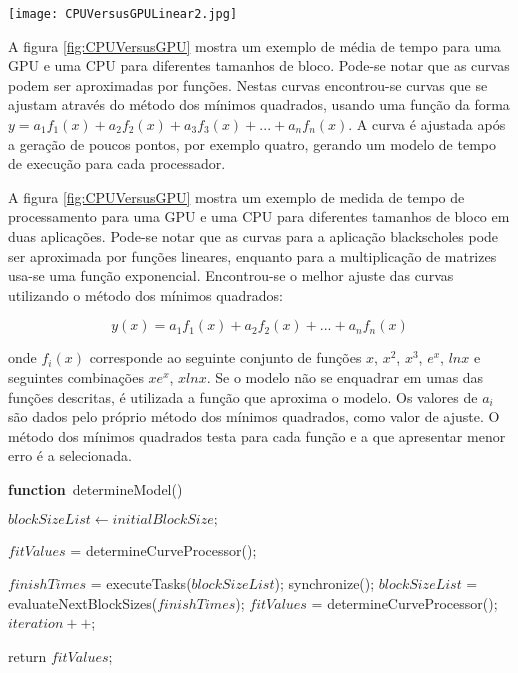 \begin{figure*}[htb]
	\begin{center}
	\centering
			\texttt{[image: CPUVersusGPULinear2.jpg]}
	\caption{Curvas para GPU x CPU}
	\label{fig:CPUVersusGPU}
	\end{center}
\end{figure*}


A figura \ref{fig:CPUVersusGPU} mostra um exemplo de média de tempo para uma GPU e uma CPU para diferentes tamanhos de bloco. Pode-se notar que as curvas podem ser aproximadas por funções. Nestas curvas encontrou-se curvas que se ajustam através do método dos mínimos quadrados, usando uma função da forma $y= a_1f_1(x) + a_2f_2(x) + a_3f_3(x) + ... + a_nf_n(x)$. A curva é ajustada após a geração de poucos pontos, por exemplo quatro, gerando um modelo de tempo de execução para cada processador.

A figura \ref{fig:CPUVersusGPU} mostra um exemplo de medida de tempo de processamento para uma GPU e uma CPU para diferentes tamanhos de bloco em duas aplicações. Pode-se notar que as curvas para a aplicação blackscholes pode ser aproximada por funções lineares, enquanto para a multiplicação de matrizes usa-se uma função exponencial. Encontrou-se o melhor ajuste das curvas utilizando o método dos mínimos quadrados:

\begin{equation}
 y(x) = a_{1} f_{1}(x) +  a_{2} f_{2}(x) + ... + a_{n} f_{n}(x) 
\label{eq: least}
\end{equation} 

onde $f_i(x)$ corresponde ao seguinte conjunto de funções $x$, $x^2$, $x^3$, $e^x$, $ln x$ e seguintes combinações $xe^x$, $xlnx$. Se o modelo não se enquadrar em umas das funções descritas, é utilizada a função que aproxima o modelo. Os valores de $a_i$ são dados pelo próprio método dos mínimos quadrados, como valor de ajuste. O método dos mínimos quadrados testa para cada função e a que apresentar menor erro é a selecionada.

\begin{algorithm}

\caption{Modelo de desempenho do processador}
\label{algModel}

\begin{algorithmic}		

\STATE \textbf{function}~determineModel()

\STATE $blockSizeList \leftarrow initialBlockSize;$

\STATE $fitValues$ = determineCurveProcessor();

		\STATE $finishTimes$ = executeTasks($blockSizeList$);
                \STATE synchronize();
	        \STATE $blockSizeList$ = evaluateNextBlockSizes($finishTimes$);
		\STATE $fitValues$ = determineCurveProcessor();
		\STATE $iteration++$;
\ENDWHILE

return $fitValues$;

\end{algorithmic}
\end{algorithm}

